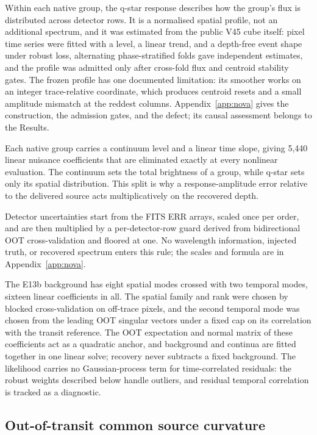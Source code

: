 Within each native group, the q-star response describes how the group's
flux is distributed across detector rows. It is a normalised spatial
profile, not an additional spectrum, and it was estimated from the public
V45 cube itself: pixel time series were fitted with a level, a linear
trend, and a depth-free event shape under robust loss, alternating
phase-stratified folds gave independent estimates, and the profile was
admitted only after cross-fold flux and centroid stability gates. The
frozen profile has one documented limitation: its smoother works on an
integer trace-relative coordinate, which produces centroid resets and a
small amplitude mismatch at the reddest columns.
Appendix~\ref{app:nova} gives the construction, the admission gates, and
the defect; its causal assessment belongs to the Results.

Each native group carries a continuum level and a linear time slope,
giving 5{,}440 linear nuisance coefficients that are eliminated exactly at
every nonlinear evaluation. The continuum sets the total brightness of a
group, while q-star sets only its spatial distribution. This split is why
a response-amplitude error relative to the delivered source acts
multiplicatively on the recovered depth.

Detector uncertainties start from the FITS ERR arrays, scaled once per
order, and are then multiplied by a per-detector-row guard derived from
bidirectional OOT cross-validation and floored at one. No wavelength
information, injected truth, or recovered spectrum enters this rule; the
scales and formula are in Appendix~\ref{app:nova}.

The E13b background has eight spatial modes crossed with two temporal
modes, sixteen linear coefficients in all. The spatial family and rank
were chosen by blocked cross-validation on off-trace pixels, and the
second temporal mode was chosen from the leading OOT singular vectors
under a fixed cap on its correlation with the transit reference. The OOT
expectation and normal matrix of these coefficients act as a quadratic
anchor, and background and continua are fitted together in one linear
solve; recovery never subtracts a fixed background. The likelihood carries
no Gaussian-process term for time-correlated residuals: the robust weights
described below handle outliers, and residual temporal correlation is
tracked as a diagnostic.

\subsection{Out-of-transit common source curvature}

